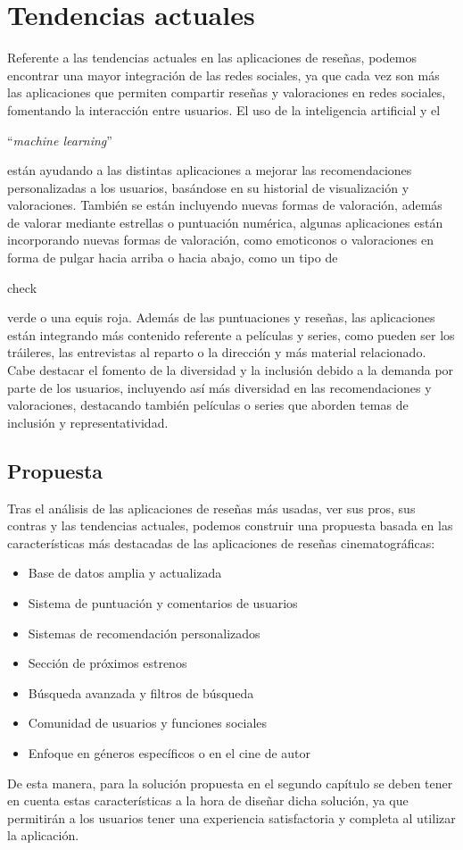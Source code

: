 \section{Tendencias actuales}

Referente a las tendencias actuales en las aplicaciones de reseñas, podemos encontrar una mayor 
integración de las redes sociales, ya que cada vez son más las aplicaciones que permiten compartir 
reseñas y valoraciones en redes sociales, fomentando la interacción entre usuarios. El uso de la 
inteligencia artificial y el \begin{otherlanguage}{english}``\textit{machine 
learning}''\end{otherlanguage} \cite{MachLear} están ayudando a las distintas aplicaciones a mejorar 
las recomendaciones personalizadas a los usuarios, basándose en su historial de visualización y 
valoraciones. También se están incluyendo nuevas formas de valoración, además de valorar mediante 
estrellas o puntuación numérica, algunas aplicaciones están incorporando nuevas formas de valoración, 
como emoticonos o valoraciones en forma de pulgar hacia arriba o hacia abajo, como un tipo de 
\begin{otherlanguage}{english}check \end{otherlanguage} verde o una equis roja. Además de las 
puntuaciones y reseñas, las aplicaciones están integrando más contenido referente a películas y 
series, como pueden ser los tráileres, las entrevistas al reparto o la dirección y más material 
relacionado. Cabe destacar el fomento de la diversidad y la inclusión debido a la demanda por parte de 
los usuarios, incluyendo así más diversidad en las recomendaciones y valoraciones, destacando también 
películas o series que aborden temas de inclusión y representatividad.

\subsection{Propuesta}

Tras el análisis de las aplicaciones de reseñas más usadas, ver sus pros, sus contras y las tendencias 
actuales, podemos construir una propuesta basada en las características más destacadas de las 
aplicaciones de reseñas cinematográficas:

\begin{itemize}
\item Base de datos amplia y actualizada
\item Sistema de puntuación y comentarios de usuarios
\item Sistemas de recomendación personalizados
\item Sección de próximos estrenos
\item Búsqueda avanzada y filtros de búsqueda
\item Comunidad de usuarios y funciones sociales
\item Enfoque en géneros específicos o en el cine de autor
\end{itemize}

De esta manera, para la solución propuesta en el segundo capítulo se deben tener en cuenta estas 
características a la hora de diseñar dicha solución, ya que permitirán a los usuarios tener una 
experiencia satisfactoria y completa al utilizar la aplicación.
